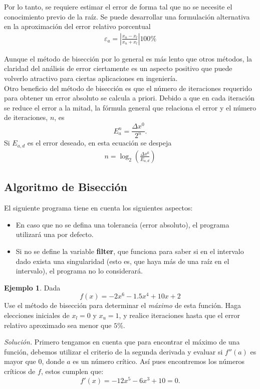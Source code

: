\documentclass[12pt,letterpaper]{article}
\providecommand{\mypar}[1]{\left( #1 \right) }
\theoremstyle{definition}
\newtheorem{ejemplo}{Ejemplo}[section]
\theoremstyle{plain}
\theoremstyle{remark}
\begin{document}
Por lo tanto, se requiere estimar el error de forma tal que no se necesite el conocimiento previo de la raíz. Se puede desarrollar una formulación alternativa en la aproximación del error relativo porcentual
\begin{align}
\varepsilon_a=\left|\frac{x_u-x_l}{x_u+x_l}\right|100\label{eq:10}\% 
\end{align}

Aunque el método de bisección por lo general es más lento que otros métodos, la claridad del análisis de error ciertamente es un aspecto positivo que puede volverlo atractivo para ciertas aplicaciones en ingeniería.\\

Otro beneficio del método de bisección es que el número de iteraciones requerido para obtener un error absoluto se calcula a priori. Debido a que en cada iteración se reduce el error a la mitad, la fórmula general que relaciona el error y el número de iteraciones, $n$, es $$E_a^n=\frac{\Delta x^0}{2^n}.$$
Si $E_{a,d}$ es el error deseado, en esta ecuación se despeja \begin{align}
n=\log_2\mypar{\frac{\Delta x^0}{E_{a,d}}}
\end{align}

\subsection{Algoritmo de Bisección}

El siguiente programa tiene en cuenta los siguientes aspectos: 
\begin{itemize}
\item En caso que no se defina una tolerancia (error absoluto), el programa utilizará una por defecto.
\item Si no se define la variable {\bf filter}, que funciona para saber si en el intervalo dado exista una singularidad (esto es, que haya más de una raíz en el intervalo), el programa no lo considerará.
\end{itemize}



\newpage

\begin{ejemplo}
Dada $$f(x)=-2x^6-1.5x^4+10x+2$$ Use el método de bisección para determinar el {\it máximo} de esta función. Haga elecciones iniciales de $x_l=0$ y $x_u=1$, y realice iteraciones hasta que el error relativo aproximado sea menor que $5\%$.
\end{ejemplo}
{\it Solución.} Primero tengamos en cuenta que para encontrar el máximo de una función, debemos utilizar el criterio de la segunda derivada y evaluar si $f''(a)$ es mayor que $0$, donde $a$ es un número crítico. Así pues encontremos los números críticos de $f$, estos cumplen que: $$f'(x)=-12x^5-6x^3+10=0.$$
\end{document}
